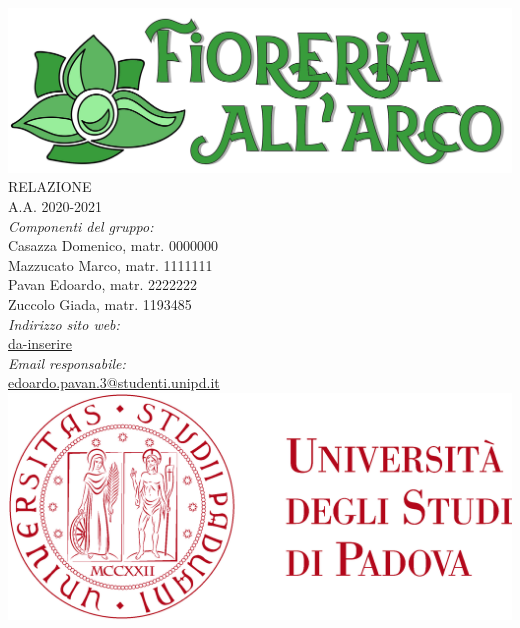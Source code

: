\thispagestyle{empty}
\begin{titlepage}
	\begin{center}
		
		\includegraphics[scale = 0.05]{../latex/images/logotitle.png}\\[1.5cm]
\Huge \textsc{RELAZIONE \doctitle{}}\\ [0.75cm]                          
\Large \textsf{A.A. 2020-2021} \\ [1cm]
		

\Large \textsl{Componenti del gruppo:} \\[0.25cm] \textsf{Casazza Domenico, matr. 0000000} \\ [0.1cm]
\Large \textsf{Mazzucato Marco, matr. 1111111} \\ [0.1cm]
\Large \textsf{Pavan Edoardo, matr. 2222222} \\ [0.1cm]
\Large \textsf{Zuccolo Giada, matr. 1193485} \\ [1.75cm]
                
\Large \textsl{Indirizzo sito web:} \\ \textsf{\href{http://www.google.it}{da-inserire}}\\[0.25cm]
\Large \textsl{Email responsabile:}\\ 
\textsf{\href{edoardo.pavan.3@studenti.unipd.it}{edoardo.pavan.3@studenti.unipd.it}}\\[1cm]

		\includegraphics[scale = 0.055]{../latex/images/logoUniPD.png}


	\end{center}
\end{titlepage}